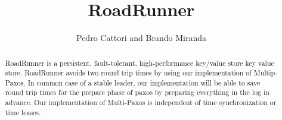 \documentclass[a4paper]{article}
\title{RoadRunner}
\author{Pedro Cattori and Brando Miranda}
\begin{document}
\maketitle

\begin{abstract}
RoadRunner is a persistent, fault-tolerant, high-performance key/value store key value store. RoadRunner avoids two round trip times by using our implementation of Multip-Paxos. In common case of a stable leader, our implementation will be able to save round trip times for the prepare phase of paxos by preparing everything in the log in advance. Our implementation of Multi-Paxos is independent of time synchronization or time leases. 
\end{abstract}
\end{document}
